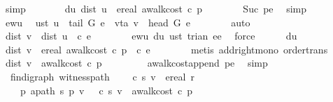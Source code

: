 \begin{isabellebody}
\ simp\isanewline
\ \ \ \ \isamarkupfalse%
\ \isamarkupfalse%
\ du{\isacharcolon}\ {\isachardoublequoteopen}dist\ u\ {\isasymle}\ ereal\ {\isacharparenleft}awalk{\isacharunderscore}cost\ c\ p{\isacharprime}{\isacharparenright}{\isachardoublequoteclose}\isanewline
\ \ \ \ \ \ \isamarkupfalse%
\ Suc\ p{\isacharprime}e\ \isamarkupfalse%
\ simp\isanewline
\ \ \ \ \isamarkupfalse%
\ ewu\ \isamarkupfalse%
\ ust{\isacharcolon}\ {\isachardoublequoteopen}u\ {\isacharequal}\ tail\ G\ e{\isachardoublequoteclose}\ \ vta{\isacharcolon}\ {\isachardoublequoteopen}v\ {\isacharequal}\ head\ G\ e{\isachardoublequoteclose}\isanewline
\ \ \ \ \ \ \isamarkupfalse%
\ auto\isanewline
\ \ \ \ \isamarkupfalse%
\ \isamarkupfalse%
\ {\isachardoublequoteopen}dist\ v\ {\isasymle}\ dist\ u\ {\isacharplus}\ c\ e{\isachardoublequoteclose}\isanewline
\ \ \ \ \ \ \isamarkupfalse%
\ ewu\ du\ ust\ trian{\isacharbrackleft}\ e{\isacharequal}e{\isacharbrackright}\ \isamarkupfalse%
\ force\isanewline
\ \ \ \ \isamarkupfalse%
\ du\ \isamarkupfalse%
\ {\isachardoublequoteopen}dist\ v\ {\isasymle}\ ereal\ {\isacharparenleft}awalk{\isacharunderscore}cost\ c\ p{\isacharprime}{\isacharparenright}\ {\isacharplus}\ c\ e{\isachardoublequoteclose}\isanewline
\ \ \ \ \ \ \isamarkupfalse%
\ {\isacharparenleft}metis\ add{\isacharunderscore}right{\isacharunderscore}mono\ order{\isacharunderscore}trans{\isacharparenright}\isanewline
\ \ \ \ \isamarkupfalse%
\ {\isachardoublequoteopen}dist\ v\ {\isasymle}\ awalk{\isacharunderscore}cost\ c\ p{\isachardoublequoteclose}\ \isanewline
\ \ \ \ \ \ \isamarkupfalse%
\ awalk{\isacharunderscore}cost{\isacharunderscore}append\ p{\isacharprime}e\ \isamarkupfalse%
\ simp\isanewline
\ \ \isamarkupfalse%
%
\endisatagproof
{\isafoldproof}%
%
\isadelimproof
\isanewline
%
\endisadelimproof
\isanewline
{}\isamarkupfalse%
\ {\isacharparenleft}\ fin{\isacharunderscore}digraph{\isacharparenright}\ witness{\isacharunderscore}path{\isacharcolon}\isanewline
\ \ \ {\isachardoublequoteopen}{\isasymmu}\ c\ s\ v\ {\isacharequal}\ ereal\ r{\isachardoublequoteclose}\isanewline
\ \ \ {\isachardoublequoteopen}{\isasymexists}\ p{\isachardot}\ apath\ s\ p\ v\ {\isasymand}\ {\isasymmu}\ c\ s\ v\ {\isacharequal}\ awalk{\isacharunderscore}cost\ c\ p{\isachardoublequoteclose}\isanewline

\end{isabellebody}
